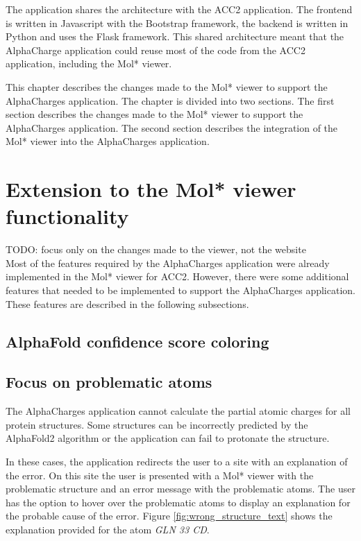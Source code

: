 \documentclass[
  digital,     %
  oneside,     %
  nosansbold,  %
  nocolorbold, %
  lof,         %
  lot,         %
]{fithesis4}
\begin{document}
The application shares the architecture with the ACC2 application. The frontend is written in Javascript with the Bootstrap framework, the backend is written in Python and uses the Flask framework. This shared architecture meant that the AlphaCharge application could reuse most of the code from the ACC2 application, including the Mol* viewer.

This chapter describes the changes made to the Mol* viewer to support the AlphaCharges application. The chapter is divided into two sections. The first section describes the changes made to the Mol* viewer to support the AlphaCharges application. The second section describes the integration of the Mol* viewer into the AlphaCharges application.

\section{Extension to the Mol* viewer functionality}

TODO: focus only on the changes made to the viewer, not the website \\

Most of the features required by the AlphaCharges application were already implemented in the Mol* viewer for ACC2. However, there were some additional features that needed to be implemented to support the AlphaCharges application. These features are described in the following subsections.

\subsection{AlphaFold confidence score coloring}

\subsection{Focus on problematic atoms}

The AlphaCharges application cannot calculate the partial atomic charges for all protein structures. Some structures can be incorrectly predicted by the AlphaFold2 algorithm or the application can fail to protonate the structure. \parencite{jumper2021alphafold}

In these cases, the application redirects the user to a site with an explanation of the error. On this site the user is presented with a Mol* viewer with the problematic structure and an error message with the problematic atoms. The user has the option to hover over the problematic atoms to display an explanation for the probable cause of the error. Figure \ref{fig:wrong_structure_text} shows the explanation provided for the atom \textit{GLN 33 CD}.
\end{document}
